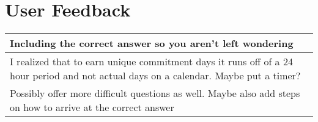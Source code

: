 \appendix
\section{\\User Feedback}
\begin{longtable}{|p{1\linewidth}|}
	
		\hline
		Including the correct answer so you aren't left wondering                                                                                                                                                                                                                                                                                                                                                                                                                                                                                                                                                                                                                                        \\
		\hline
		I realized that to earn unique commitment days it runs off of a 24 hour period and not actual days on a calendar. Maybe put a timer?                                                                                                                                                                                                                                                                                                                                                                                                                                                                                                                                                             \\
		\hline
		Possibly offer more difficult questions as well. Maybe also add steps on how to arrive at the correct answer                                                                                                                                                                                                                                                                                                                                                                                                                                                                                                                                                                                     \\

\end{longtable}
